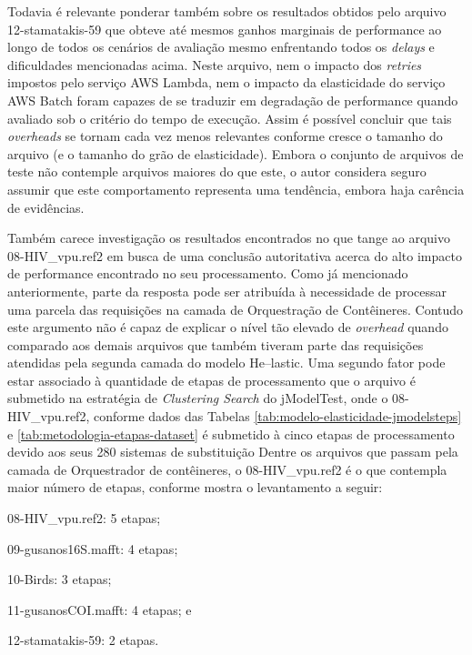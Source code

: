 \documentclass[english,brazilian]{UNISINOSmonografia} %
\begin{document}
Todavia é relevante ponderar também sobre os resultados obtidos pelo arquivo 12-stamatakis-59 que obteve até mesmos ganhos marginais de performance ao longo de todos os cenários de avaliação mesmo enfrentando todos os \textit{delays} e dificuldades mencionadas acima.
%
Neste arquivo, nem o impacto dos \textit{retries} impostos pelo serviço AWS Lambda, nem o impacto da elasticidade do serviço AWS Batch foram capazes de se traduzir em degradação de performance quando avaliado sob o critério do tempo de execução.
%
Assim é possível concluir que tais \textit{overheads} se tornam cada vez menos relevantes conforme cresce o tamanho do arquivo (e o tamanho do grão de elasticidade).
%
Embora o conjunto de arquivos de teste não contemple arquivos maiores do que este, o autor considera seguro assumir que este comportamento representa uma tendência, embora haja carência de evidências.




Também carece investigação os resultados encontrados no que tange ao arquivo 08-HIV\_vpu.ref2 em busca de uma conclusão autoritativa acerca do alto impacto de performance encontrado no seu processamento.
%
Como já mencionado anteriormente, parte da resposta pode ser atribuída à necessidade de processar uma parcela das requisições na camada de Orquestração de Contêineres.
%
Contudo este argumento não é capaz de explicar o nível tão elevado de \textit{overhead} quando comparado aos demais arquivos que também tiveram parte das requisições atendidas pela segunda camada do modelo \textsf{He}--lastic.
%
Uma segundo fator pode estar associado à quantidade de etapas de processamento que o arquivo é submetido na estratégia de \textit{Clustering Search} do jModelTest, onde o 08-HIV\_vpu.ref2, conforme dados das Tabelas \ref{tab:modelo-elasticidade-jmodelsteps} e \ref{tab:metodologia-etapas-dataset} é submetido à cinco etapas de processamento devido aos seus 280 sistemas de substituição
%
Dentre os arquivos que passam pela camada de Orquestrador de contêineres, o 08-HIV\_vpu.ref2 é o que contempla maior número de etapas, conforme mostra o levantamento a seguir: 
\begin{inparaenum}[] 
	\item 08-HIV\_vpu.ref2: 5 etapas;
	\item 09-gusanos16S.mafft: 4 etapas;
	\item 10-Birds: 3 etapas;
	\item 11-gusanosCOI.mafft: 4 etapas; e
	\item 12-stamatakis-59: 2 etapas.
\end{inparaenum}
\end{document}
